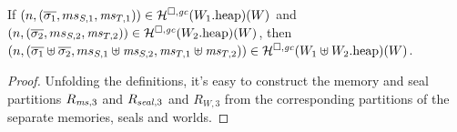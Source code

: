 \documentclass[a4paper]{article}
\begin{document}
\begin{lemma}
  \label{lem:combined-memory-disjoint-world}
  If $\npair{(\overline{\sigma_1},ms_{S,1},\ms_{T,1})}\in\lrheap(\pwheap[W_1])(W)$ and $\npair{(\overline{\sigma_2},ms_{S,2},\ms_{T,2})} \in \lrheap(\pwheap[W_2])(W)$, then $\npair{(\overline{\sigma_1}\uplus\overline{\sigma_2},ms_{S,1}\uplus \ms_{S,2},\ms_{T,1}\uplus \ms_{T,2})} \in \lrheap(\pwheap[W_1 \uplus W_2])(W)$.
\end{lemma}
\begin{proof}
  Unfolding the definitions, it's easy to construct the memory and seal partitions $R_{\ms,3}$ and $R_{\var{seal},3}$ and $R_{W,3}$ from the corresponding partitions of the separate memories, seals and worlds.
\end{proof}
\end{document}
